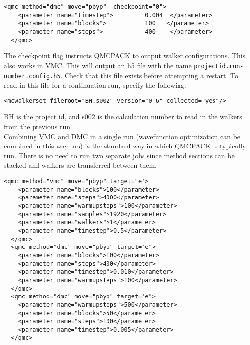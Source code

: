 \begin{lstlisting}[style=QMCPXML,caption=The following is an example of running a simulation that can be restarted. ]
  <qmc method="dmc" move="pbyp"  checkpoint="0">
    <parameter name="timestep">         0.004  </parameter>
    <parameter name="blocks">           100   </parameter>
    <parameter name="steps">            400    </parameter>
  </qmc>
\end{lstlisting}
The checkpoint flag instructs QMCPACK to output walker configurations.  This also
works in VMC.  This will output an h5 file with the name \texttt{projectid.run-number.config.h5}.
Check that this file exists before attempting a restart.
To read in this file for a continuation run, specify the following:
\begin{lstlisting}[caption=Restart (read walkers from previous run) ]
 <mcwalkerset fileroot="BH.s002" version="0 6" collected="yes"/>
\end{lstlisting}
BH is the project id, and s002 is the calculation number to read in the walkers from the previous run.\\

Combining VMC and DMC in a single run (wavefunction optimization can be combined in this way too) is the standard way in which QMCPACK is typically run.   There is no need to run two separate jobs since method sections can be stacked and walkers are transferred between them.

\begin{lstlisting}[style=QMCPXML,caption=Combined VMC and DMC run. ]
  <qmc method="vmc" move="pbyp" target="e">
    <parameter name="blocks">100</parameter>
    <parameter name="steps">4000</parameter>
    <parameter name="warmupsteps">100</parameter>
    <parameter name="samples">1920</parameter>
    <parameter name="walkers">1</parameter>
    <parameter name="timestep">0.5</parameter>
  </qmc>
  <qmc method="dmc" move="pbyp" target="e">
    <parameter name="blocks">100</parameter>
    <parameter name="steps">400</parameter>
    <parameter name="timestep">0.010</parameter>
    <parameter name="warmupsteps">100</parameter>
  </qmc>
  <qmc method="dmc" move="pbyp" target="e">
    <parameter name="warmupsteps">500</parameter>
    <parameter name="blocks">50</parameter>
    <parameter name="steps">100</parameter>
    <parameter name="timestep">0.005</parameter>
  </qmc>
\end{lstlisting}




